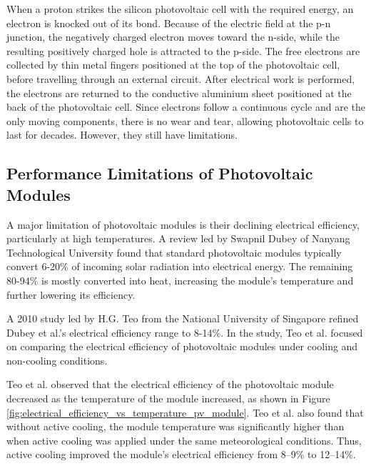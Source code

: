 When a proton strikes the silicon photovoltaic cell with the required energy, an electron is knocked out of its bond. Because of the electric field at the p-n junction, the negatively charged electron moves toward the n-side, while the resulting positively charged hole is attracted to the p-side. The free electrons are collected by thin metal fingers positioned at the top of the photovoltaic cell, before travelling through an external circuit. After electrical work is performed, the electrons are returned to the conductive aluminium sheet positioned at the back of the photovoltaic cell. Since electrons follow a continuous cycle and are the only moving components, there is no wear and tear, allowing photovoltaic cells to last for decades. \cite{TED-Ed2016HowKomp} However, they still have limitations.\vspace{0.5em}

\pagebreak
\subsection{Performance Limitations of Photovoltaic Modules}
A major limitation of photovoltaic modules is their declining electrical efficiency, particularly at high temperatures. A review led by Swapnil Dubey of Nanyang Technological University found that standard photovoltaic modules typically convert 6-20\% of incoming solar radiation into electrical energy. The remaining 80-94\% is mostly converted into heat, increasing the module’s temperature and further lowering its efficiency. \cite{Dubey2013TemperatureReview}\vspace{0.5em}

A 2010 study led by H.G. Teo from the National University of Singapore refined Dubey et al.'s electrical efficiency range to 8-14\%. In the study, Teo et al. focused on comparing the electrical efficiency of photovoltaic modules under cooling and non-cooling conditions.\vspace{0.5em}

Teo et al. observed that the electrical efficiency of the photovoltaic module decreased as the temperature of the module increased, as shown in Figure \ref{fig:electrical_efficiency_vs_temperature_pv_module}. Teo et al. also found that without active cooling, the module temperature was significantly higher than when active cooling was applied under the same meteorological conditions. Thus, active cooling improved the module’s electrical efficiency from 8–9\% to 12–14\%. \cite{Teo2012AnModules}


